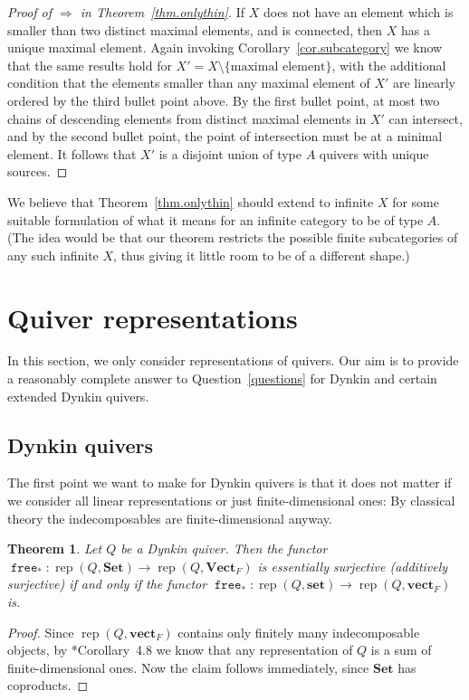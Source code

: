 \documentclass[a4paper]{amsart}
\theoremstyle{plain}
\newtheorem{theorem}{Theorem}[section]
\theoremstyle{definition}
\theoremstyle{remark}
\newcommand{\funct}[1]{\operatorname{\mathtt{#1}}}
\newcommand{\Set}{\mathbf{Set}}
\newcommand{\set}{\mathbf{set}}
\newcommand{\VectF}{\mathbf{Vect}_F}
\newcommand{\vectF}{\mathbf{vect}_F}
\DeclareMathOperator{\rep}{rep}
\begin{document}
\begin{proof}[Proof of \( \Rightarrow \) in Theorem~\ref{thm.onlythin}]
If \( X \) does not have an element which is smaller than two distinct maximal elements, and is connected, then \( X \) has a unique maximal element. Again invoking Corollary~\ref{cor.subcategory} we know that the same results hold for \( X' = X \setminus \{ \text{maximal element} \} \), with the additional condition that the elements smaller than any maximal element of \( X' \) are linearly ordered by the third bullet point above. By the first bullet point, at most two chains of descending elements from distinct maximal elements in $X'$ can intersect, and by the second bullet point, the point of intersection must be at a minimal element. It follows that \( X' \) is a disjoint union of type \( A \) quivers with unique sources.
\end{proof}

We believe that Theorem~\ref{thm.onlythin} should extend to infinite \( X \) for some suitable formulation of what it means for an infinite category to be of type \( A \). (The idea would be that our theorem restricts the possible finite subcategories of any such infinite \( X \), thus giving it little room to be of a different shape.)

\section{Quiver representations} \label{sec.quivers}

In this section, we only consider representations of quivers. Our aim is to provide a reasonably complete answer to Question~\ref{questions} for Dynkin and certain extended Dynkin quivers.

\subsection{Dynkin quivers}

The first point we want to make for Dynkin quivers is that it does not matter if we consider all linear representations or just finite-dimensional ones: By classical theory the indecomposables are finite-dimensional anyway.

\begin{theorem}
Let \( Q \) be a Dynkin quiver. Then the functor \( \funct{free}_* \colon \rep(Q, \Set) \to \rep(Q, \VectF) \) is essentially surjective (additively surjective) if and only if the functor \( \funct{free}_* \colon \rep( Q, \set) \to \rep( Q, \vectF) \) is.
\end{theorem}

\begin{proof}
Since \( \rep( Q, \vectF) \) contains only finitely many indecomposable objects, by \cite{RepresentationTheoryOfArtinAlgebrasII}*{Corollary~4.8} we know that any representation of \( Q \) is a sum of finite-dimensional ones. Now the claim follows immediately, since \( \Set \) has coproducts.
\end{proof}
\end{document}
